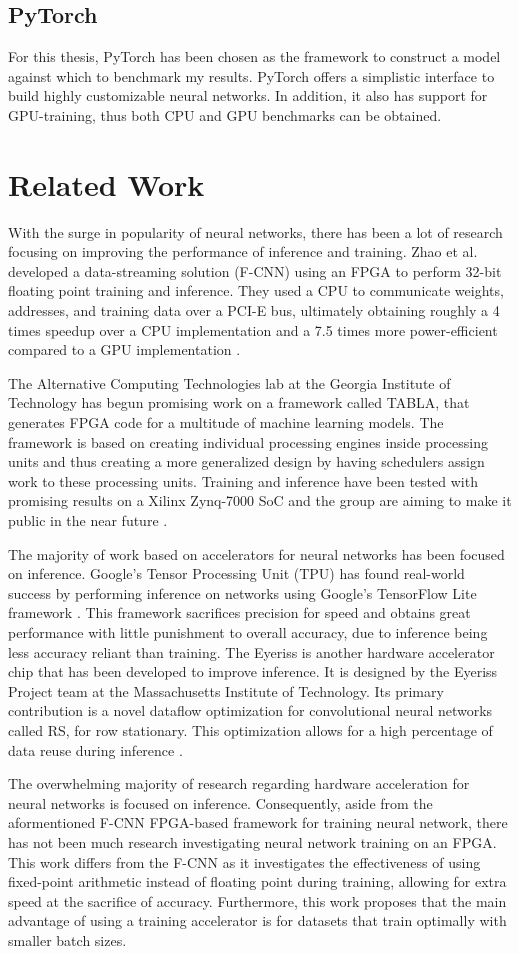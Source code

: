 \subsection{PyTorch}
For this thesis, PyTorch has been chosen as the framework to construct a model against which to benchmark my results. PyTorch offers a simplistic interface to build highly customizable neural networks. In addition, it also has support for GPU-training, thus both CPU and GPU benchmarks can be obtained.

\section{Related Work}
With the surge in popularity of neural networks, there has been a lot of research focusing on improving the performance of inference and training. Zhao et al. developed a data-streaming solution (F-CNN) using an FPGA to perform 32-bit floating point training and inference. They used a CPU to communicate weights, addresses, and training data over a PCI-E bus, ultimately obtaining roughly a 4 times speedup over a CPU implementation and a 7.5 times more power-efficient compared to a GPU implementation \cite{FCNN}.

The Alternative Computing Technologies lab at the  Georgia Institute of Technology has begun promising work on a framework called TABLA, that generates FPGA code for a multitude of machine learning models. The framework is based on creating individual processing engines inside processing units and thus creating a more generalized design by having schedulers assign work to these processing units. Training and inference have been tested with promising results on a Xilinx Zynq-7000 SoC and the group are aiming to make it public in the near future \cite{TABLA}.

The majority of work based on accelerators for neural networks has been focused on inference. Google's Tensor Processing Unit (TPU) has found real-world success by performing inference on networks using Google's TensorFlow Lite framework \cite{TPU}. This framework sacrifices precision for speed and obtains great performance with little punishment to overall accuracy, due to inference being less accuracy reliant than training. The Eyeriss is another hardware accelerator chip that has been developed to improve inference. It is designed by the Eyeriss Project team at the Massachusetts Institute of Technology. Its primary contribution is a novel dataflow optimization for convolutional neural networks called RS, for row stationary. This optimization allows for a high percentage of data reuse during inference \cite{eyeriss}.

The overwhelming majority of research regarding hardware acceleration for neural networks is focused on inference. Consequently, aside from the aformentioned F-CNN FPGA-based framework for training neural network, there has not been much research investigating neural network training on an FPGA. This work differs from the F-CNN as it investigates the effectiveness of using fixed-point arithmetic instead of floating point during training, allowing for extra speed at the sacrifice of accuracy. Furthermore, this work proposes that the main advantage of using a training accelerator is for datasets that train optimally with smaller batch sizes.